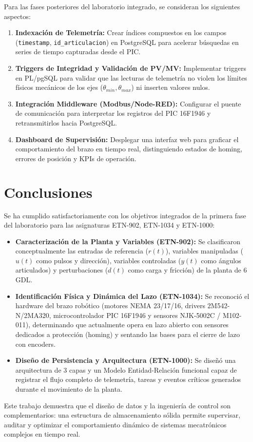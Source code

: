 \documentclass[11pt]{article}
\begin{document}
Para las fases posteriores del laboratorio integrado, se consideran los siguientes aspectos:

\begin{enumerate}
	\item \textbf{Indexación de Telemetría:} Crear índices compuestos en los campos (\texttt{timestamp}, \texttt{id\_articulacion}) en PostgreSQL para acelerar búsquedas en series de tiempo capturadas desde el PIC.
	\item \textbf{Triggers de Integridad y Validación de PV/MV:} Implementar triggers en PL/pgSQL para validar que las lecturas de telemetría no violen los límites físicos mecánicos de los ejes ($\theta_{min}, \theta_{max}$) ni inserten valores nulos.
	\item \textbf{Integración Middleware (Modbus/Node-RED):} Configurar el puente de comunicación para interpretar los registros del PIC 16F1946 y retransmitirlos hacia PostgreSQL.
	\item \textbf{Dashboard de Supervisión:} Desplegar una interfaz web para graficar el comportamiento del brazo en tiempo real, distinguiendo estados de homing, errores de posición y KPIs de operación.
\end{enumerate}

\section{Conclusiones}

Se ha cumplido satisfactoriamente con los objetivos integrados de la primera fase del laboratorio para las asignaturas ETN-902, ETN-1034 y ETN-1000:

\begin{itemize}
	\item \textbf{Caracterización de la Planta y Variables (ETN-902):} Se clasificaron conceptualmente las entradas de referencia ($r(t)$), variables manipuladas ($u(t)$ como pulsos y dirección), variables controladas ($y(t)$ como ángulos articulados) y perturbaciones ($d(t)$ como carga y fricción) de la planta de 6 GDL.
	
	\item \textbf{Identificación Física y Dinámica del Lazo (ETN-1034):} Se reconoció el hardware del brazo robótico (motores NEMA 23/17/16, drivers 2M542-N/2MA320, microcontrolador PIC 16F1946 y sensores NJK-5002C / M102-011), determinando que actualmente opera en lazo abierto con sensores dedicados a protección (homing) y sentando las bases para el cierre de lazo con encoders.
	
	\item \textbf{Diseño de Persistencia y Arquitectura (ETN-1000):} Se diseñó una arquitectura de 3 capas y un Modelo Entidad-Relación funcional capaz de registrar el flujo completo de telemetría, tareas y eventos críticos generados durante el movimiento de la planta.
\end{itemize}

Este trabajo demuestra que el diseño de datos y la ingeniería de control son complementarios: una estructura de almacenamiento sólida permite supervisar, auditar y optimizar el comportamiento dinámico de sistemas mecatrónicos complejos en tiempo real.
\end{document}
